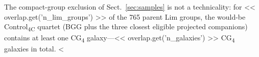\documentclass{aa}
\newcommand{\CC}{Control\textsubscript{4C}}
\newcommand{\CG}{CG\textsubscript{4}}
\newcommand{\Rmed}{\langle R_{ij}\rangle}
\begin{document}
\begin{appendix}
The compact-group exclusion of Sect.~\ref{sec:samples} is not a technicality: for << overlap.get('n_lim_groups') >> of the 765 parent Lim groups, the would-be \CC{} quartet (BGG plus the three closest eligible projected companions) contains at least one \CG{} galaxy---<< overlap.get('n_galaxies') >> \CG{} galaxies in total. <%
\end{appendix}
\end{document}
